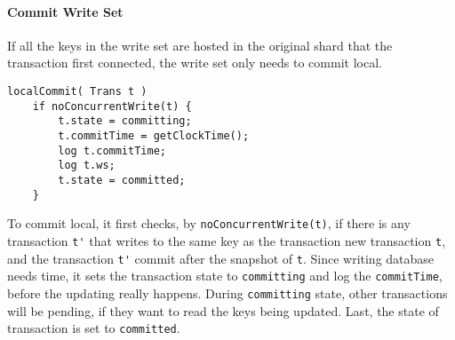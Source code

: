 \paragraph{\bf Commit Write Set}
If all the keys in the write set are hosted in the original shard that the transaction first connected,
the write set only needs to commit local.
\begin{lstlisting}[caption={Local Commit},label={lst:clock-si-local-commit}]
localCommit( Trans t )
    if noConcurrentWrite(t) {
        t.state = committing;
        t.commitTime = getClockTime();
        log t.commitTime;
        log t.ws;
        t.state = committed;
    }
\end{lstlisting}
To commit local, it first checks, by \verb|noConcurrentWrite(t)|,
if there is any transaction \verb|t'| 
that writes to the same key as the transaction new transaction \verb|t|,
and the transaction \verb|t'| commit after the snapshot of \verb|t|.
Since writing database needs time,
it sets the transaction state to \verb|committing| and
log the \verb|commitTime|, before the updating really happens.
During \verb|committing| state, other transactions will be pending, 
if they want to read the keys being updated.
Last, the state of transaction is set to \verb|committed|.

